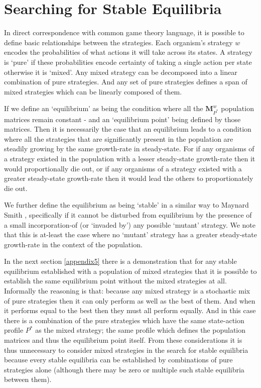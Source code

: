 \section{Searching for Stable Equilibria}\label{sec:equilibria}

In direct correspondence with common game theory language, it is possible to define basic relationships between the strategies.
Each organism's strategy $w$ encodes the probabilities of what actions it will take across its states.  A strategy is `pure' if these probabilities encode certainty of taking a single action per state otherwise it is `mixed'. Any mixed strategy can be decomposed into a linear combination of pure strategies. And any set of pure strategies defines a span of mixed strategies which can be linearly composed of them.

If we define an `equilibrium' as being the condition where all the $\mathbf{M}_{P^*}^w$ population matrices remain constant - and an `equilibrium point' being defined by those matrices.
Then it is necessarily the case that an equilibrium leads to a condition where all the strategies that are significantly present in the population are steadily growing by the same growth-rate in steady-state. For if any organisms of a strategy existed in the population with a lesser steady-state growth-rate then it would proportionally die out, or if any organisms of a strategy existed with a greater steady-state growth-rate then it would lead the others to proportionately die out.

We further define the equilibrium as being `stable' in a similar way to Maynard Smith \cite{maynard, maynard2, weibull}, specifically if it cannot be disturbed from equilibrium by the presence of a small incorporation-of (or `invaded by') any possible `mutant' strategy. We note that this is at-least the case where no `mutant' strategy has a greater steady-state growth-rate in the context of the population.

In the next section \ref{appendix5} there is a demonstration that for any stable equilibrium established with a population of mixed strategies that it is possible to establish the same equilibrium point without the mixed strategies at all.
Informally the reasoning is that: because any mixed strategy is a stochastic mix of pure strategies then it can only perform as well as the best of them. And when it performs equal to the best then they must all perform equally. And in this case there is a combination of the pure strategies which have the same state-action profile $P^*$ as the mixed strategy; the same profile which defines the population matrices and thus the equilibrium point itself.
From these considerations it is thus unnecessary to consider mixed strategies in the search for stable equilibria because every stable equilibria can be established by combinations of pure strategies alone (although there may be zero or multiple such stable equilibria between them).

